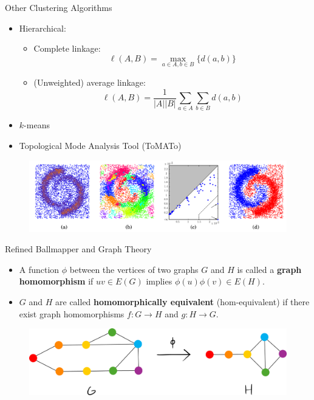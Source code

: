 \documentclass{beamer}
\begin{document}
\begin{frame}{Other Clustering Algorithms}
  \begin{itemize}
    \item Hierarchical:
    \begin{itemize}
      \item Complete linkage: $$\ell(A, B) = \max_{a\in A, b\in B}\{d(a,b)\}$$
      \item (Unweighted) average linkage: $$\ell(A,B) = \frac{1}{|A||B|}\sum_{a\in A}\sum_{b\in B}d(a,b)$$
    \end{itemize}
    \item $k$-means
    \item Topological Mode Analysis Tool (ToMATo) \cite{tomato}

  \end{itemize}
  \begin{figure}
    \begin{center}
      \includegraphics[width=1\textwidth]{tdaclusters.png}
    \end{center}
  \end{figure}
\end{frame}


\begin{frame}{Refined Ballmapper and Graph Theory}
  \begin{itemize}
    \item A function $\phi$ between the vertices of two graphs $G$ and $H$ is called a \textbf{graph homomorphism} if $uv\in E(G)$ implies $\phi(u)\phi(v)\in E(H)$.
    \item $G$ and $H$ are called \textbf{homomorphically equivalent} (hom-equivalent) if there exist graph homomorphisms $f: G\to H$ and $g: H\to G$.
  \end{itemize}
  \begin{figure}
    \begin{center}
      \includegraphics[width=1\textwidth]{graphhomo.png}
    \end{center}
  \end{figure}
\end{frame}
\end{document}
